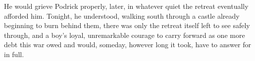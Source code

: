 He would grieve Podrick properly, later, in whatever quiet the retreat eventually afforded him. Tonight, he understood, walking south through a castle already beginning to burn behind them, there was only the retreat itself left to see safely through, and a boy’s loyal, unremarkable courage to carry forward as one more debt this war owed and would, someday, however long it took, have to answer for in full.